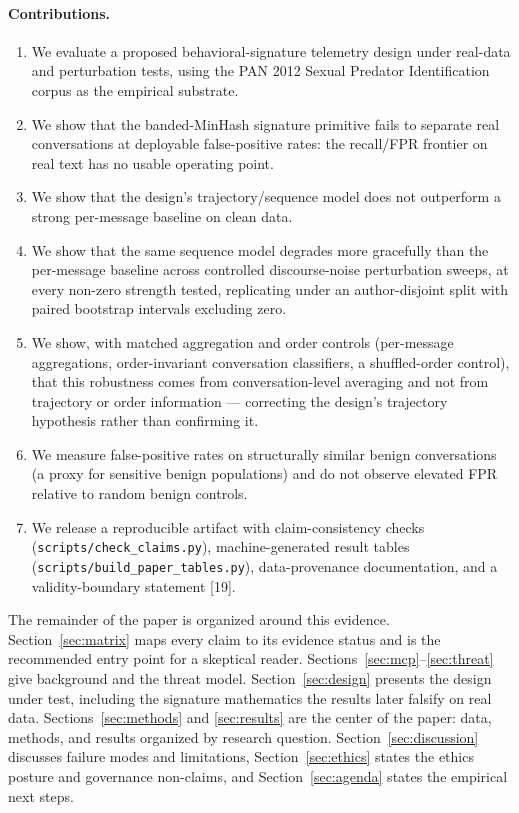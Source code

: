 \documentclass[11pt]{article}
\begin{document}
\paragraph{Contributions.}
\begin{enumerate}[leftmargin=2em]
\item We evaluate a proposed behavioral-signature telemetry design under real-data and perturbation tests, using the PAN 2012 Sexual Predator Identification corpus as the empirical substrate.
\item We show that the banded-MinHash signature primitive fails to separate real conversations at deployable false-positive rates: the recall/FPR frontier on real text has no usable operating point.
\item We show that the design's trajectory/sequence model does not outperform a strong per-message baseline on clean data.
\item We show that the same sequence model degrades more gracefully than the per-message baseline across controlled discourse-noise perturbation sweeps, at every non-zero strength tested, replicating under an author-disjoint split with paired bootstrap intervals excluding zero.
\item We show, with matched aggregation and order controls (per-message aggregations, order-invariant conversation classifiers, a shuffled-order control), that this robustness comes from conversation-level averaging and not from trajectory or order information — correcting the design's trajectory hypothesis rather than confirming it.
\item We measure false-positive rates on structurally similar benign conversations (a proxy for sensitive benign populations) and do not observe elevated FPR relative to random benign controls.
\item We release a reproducible artifact with claim-consistency checks (\texttt{scripts/check\_claims.py}), machine-generated result tables (\texttt{scripts/build\_paper\_tables.py}), data-provenance documentation, and a validity-boundary statement [19].
\end{enumerate}

The remainder of the paper is organized around this evidence. Section~\ref{sec:matrix} maps every claim to its evidence status and is the recommended entry point for a skeptical reader. Sections~\ref{sec:mcp}--\ref{sec:threat} give background and the threat model. Section~\ref{sec:design} presents the design under test, including the signature mathematics the results later falsify on real data. Sections~\ref{sec:methods} and \ref{sec:results} are the center of the paper: data, methods, and results organized by research question. Section~\ref{sec:discussion} discusses failure modes and limitations, Section~\ref{sec:ethics} states the ethics posture and governance non-claims, and Section~\ref{sec:agenda} states the empirical next steps.
\end{document}

